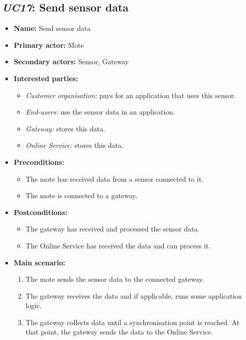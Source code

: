 \subsection{\emph{UC17}: Send sensor data}
\begin{itemize}
    \item \textbf{Name:} Send sensor data
    \item \textbf{Primary actor:} Mote
    \item \textbf{Secondary actors:} Sensor, Gateway
    \item \textbf{Interested parties:}
        \begin{itemize}
            \item \textit{Customer organisation:} pays for an application that uses this sensor.
            \item \textit{End-users:} use the sensor data in an application.
            \item \textit{Gateway:} stores this data.
            \item \textit{Online Service:} stores this data.
        \end{itemize}

    \item \textbf{Preconditions:}
        \begin{itemize}
            \item The mote has received data from a sensor connected to it.
            \item The mote is connected to a gateway.
        \end{itemize}

    \item \textbf{Postconditions:}
        \begin{itemize}
            \item The gateway has received and processed the sensor data.
            \item The Online Service has received the data and can process it.
        \end{itemize}

    \item \textbf{Main scenario:}
        \begin{enumerate}
           \item The mote sends the sensor data to the connected gateway.
           \item The gateway receives the data and if applicable, runs some application logic.
           \item The gateway collects data until a synchronisation point is reached.
                 At that point, the gateway sends the data to the Online Service.
        \end{enumerate}


\end{itemize}
